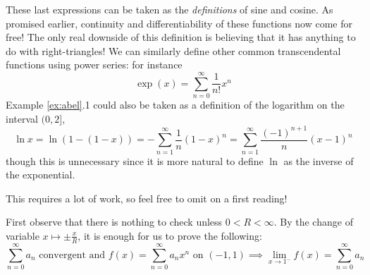 These last expressions can be taken as the \emph{definitions} of sine and cosine. As promised earlier, continuity and differentiability of these functions now come for free! The only real downside of this definition is believing that it has anything to do with right-triangles!\smallbreak
We can similarly define other common transcendental functions using power series: for instance
\[
	\exp(x)=\sum\limits_{n=0}^\infty \frac 1{n!}x^n %
\]
Example \ref{ex:abel}.1 could also be taken as a definition of the logarithm on the interval $(0,2]$, 
\[
	\ln x=\ln(1-(1-x))=-\sum_{n=1}^\infty \frac 1n(1-x)^n 
	=\sum_{n=1}^\infty \frac{(-1)^{n+1}}n(x-1)^n
\]
though this is unnecessary since it is more natural to define $\ln$ as the inverse of the exponential.


\goodbreak



This requires a lot of work, so feel free to omit on a first reading!\bigbreak

First observe that there is nothing to check unless $0<R<\infty$. By the change of variable $x\mapsto \pm\frac xR$, it is enough for us to prove the following:
\[
	\sum\limits_{n=0}^\infty a_n\text{ convergent and } 
	f(x)=\sum\limits_{n=0}^\infty a_nx^n\text{ on }(-1,1)
	\implies\lim\limits_{x\to 1^-}f(x)=\sum\limits_{n=0}^\infty a_n
\]

